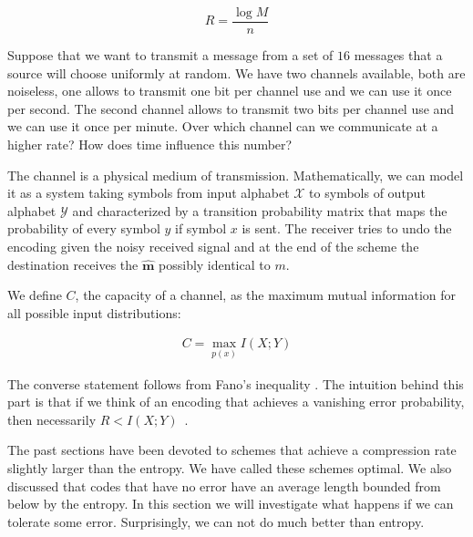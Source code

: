 \begin{equation}
R=\frac{\log M}{n}
\end{equation}

\begin{exercise}
Suppose that we want to transmit a message from a set of $16$ messages that a source will choose uniformly at random. We have two channels available, both are noiseless, one allows to transmit one bit per channel use and we can use it once per second. The second channel allows to transmit two bits per channel use and we can use it once per minute. Over which channel can we communicate at a higher rate? How does time influence this number?
\end{exercise}
The channel is a physical medium of transmission. Mathematically, we can model it as a system taking symbols from input alphabet $\mathcal{X}$ to symbols of output alphabet $\mathcal{Y}$ and characterized by a transition probability matrix that maps the probability of every symbol $y$ if symbol $x$ is sent. The receiver tries to undo the encoding given the noisy received signal and at the end of the scheme the destination receives the $\mathbf{\hat{m}}$ possibly identical to $m$.

We define $C$, the capacity of a channel, as the maximum mutual information for all possible input distributions: 

\begin{eqnarray}
\label{eq:capform}
C = \max_{p(x)} I(X;Y)
\end{eqnarray}


The converse statement follows from Fano's inequality \cite{Fano_61}. The intuition behind this part is that if we think of an encoding that achieves a vanishing error probability, then necessarily $R<I(X;Y)$~\cite{Cover_91}. 

The past sections have been devoted to schemes that achieve a compression rate slightly larger than the entropy. We have called these schemes optimal. We also discussed that codes that have no error have an average length bounded from below by the entropy. In this section we will investigate what happens if we can tolerate some error. Surprisingly, we can not do much better than entropy. 

